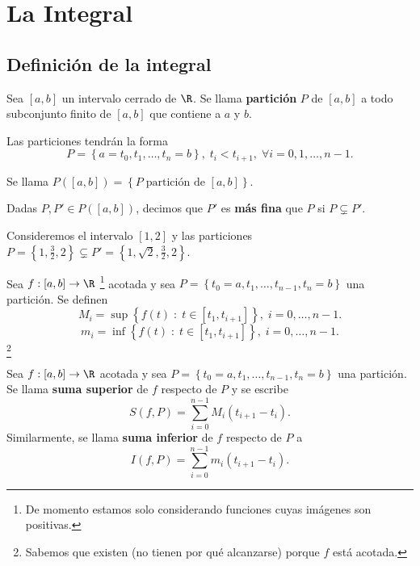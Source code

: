 \chapter{La Integral}
\section{Definición de la integral}
\begin{fdefinition}[Partición]
	\normalfont Sea $\displaystyle \left[a,b\right]  $ un intervalo cerrado de $\displaystyle \R $. Se llama \textbf{partición} $\displaystyle P $ de $\displaystyle [a,b] $ a todo subconjunto finito de $\displaystyle [a,b] $ que contiene a $\displaystyle a $ y $\displaystyle b $. 
\end{fdefinition}
\begin{observation}
\normalfont Las particiones tendrán la forma
\[ P = \left\{ a = t_{0}, t_{1}, \ldots, t_{n} = b\right\}, \; t_{i} < t_{i+1}, \; \forall i = 0,1, \ldots, n-1 .\]
\begin{notation}
\normalfont Se llama $\displaystyle P\left([a,b]\right) = \left\{ P \; \text{partición de } [a,b]\right\} $.
\end{notation}
\end{observation}
\begin{fdefinition}[]
	\normalfont Dadas $\displaystyle P, P' \in P\left([a,b]\right) $, decimos que $\displaystyle P' $ es \textbf{más fina} que $\displaystyle P $ si $\displaystyle P \subsetneq P' $.
\end{fdefinition}
\begin{eg}
	\normalfont Consideremos el intervalo $\displaystyle [1,2] $ y las particiones $\displaystyle P = \left\{ 1, \frac{3}{2}, 2\right\} \subsetneq P' = \left\{ 1, \sqrt{2},\frac{3}{2}, 2\right\}  $.
\end{eg}
\begin{fdefinition}[]
	\normalfont Sea $\displaystyle f: [a,b] \to \R $ \footnote{De momento estamos solo considerando funciones cuyas imágenes son positivas.} acotada y sea $\displaystyle P = \left\{ t_{0}= a, t_{1}, \ldots, t_{n-1}, t_{n} = b\right\}  $ una partición. Se definen
	\[ M_{i} = \sup \left\{ f\left(t\right) \; : \; t \in [t_{1}, t_{i+1}]\right\}, \; i = 0, \ldots, n-1  .\]
	\[ m_{i} = \inf \left\{ f\left(t\right) \; : \; t \in [t_{1}, t_{i+1}]\right\}, \; i = 0, \ldots, n-1  .\]
\footnote{Sabemos que existen (no tienen por qué alcanzarse) porque $\displaystyle f $ está acotada.} 	
\end{fdefinition}
\begin{fdefinition}[]
	\normalfont Sea $\displaystyle f : [a,b] \to \R $ acotada y sea $\displaystyle P = \left\{ t_{0}= a, t_{1}, \ldots, t_{n-1}, t_{n} = b\right\}  $ una partición. Se llama \textbf{suma superior} de $\displaystyle f $ respecto de $\displaystyle P $ y se escribe 
	\[ S\left(f, P\right) = \sum^{n-1}_{i = 0}M_{i}\left(t_{i+1}-t_{i}\right) .\]
	Similarmente, se llama \textbf{suma inferior} de $\displaystyle f $ respecto de $\displaystyle P $ a
	\[ I\left(f,P\right)= \sum^{n-1}_{i = 0}m_{i}\left(t_{i+1}-t_{i}\right) .\]
	 
\end{fdefinition}
